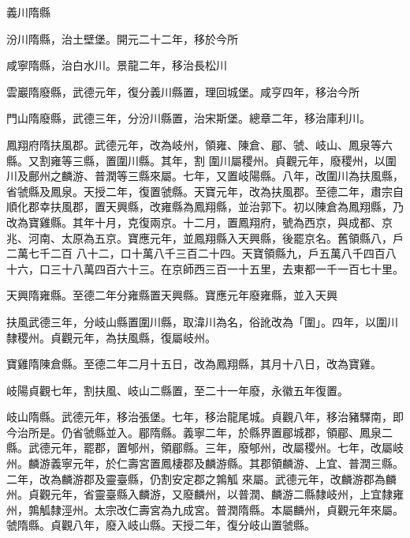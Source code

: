 \begin{pinyinscope}
 義川隋縣



 汾川隋縣，治土壁堡。開元二十二年，移於今所



 咸寧隋縣，治白水川。景龍二年，移治長松川



 雲巖隋廢縣，武德元年，復分義川縣置，理回城堡。咸亨四年，移治今所



 門山隋廢縣，武德三年，分汾川縣置，治宋斯堡。總章二年，移治庫利川。



 鳳翔府隋扶風郡。武德元年，改為岐州，領雍、陳倉、郿、虢、岐山、鳳泉等六縣。又割雍等三縣，置圍川縣。其年，割
 圍川屬稷州。貞觀元年，廢稷州，以圍川及鄜州之麟游、普潤等三縣來屬。七年，又置岐陽縣。八年，改圍川為扶風縣，省虢縣及鳳泉。天授二年，復置虢縣。天寶元年，改為扶風郡。至德二年，肅宗自順化郡幸扶風郡，置天興縣，改雍縣為鳳翔縣，並治郭下。初以陳倉為鳳翔縣，乃改為寶雞縣。其年十月，克復兩京。十二月，置鳳翔府，號為西京，與成都、京兆、河南、太原為五京。寶應元年，並鳳翔縣入天興縣，後罷京名。舊領縣八，戶二萬七千二百
 八十二，口十萬八千三百二十四。天寶領縣九，戶五萬八千四百八十六，口三十八萬四百六十三。在京師西三百一十五里，去東都一千一百七十里。



 天興隋雍縣。至德二年分雍縣置天興縣。寶應元年廢雍縣，並入天興



 扶風武德三年，分岐山縣置圍川縣，取湋川為名，俗訛改為「圍」。四年，以圍川隸稷州。貞觀元年，為扶風縣，復屬岐州。



 寶雞隋陳倉縣。至德二年二月十五日，改為鳳翔縣，其月十八日，改為寶雞。



 岐陽貞觀七年，割扶風、岐山二縣置，至二十一年廢，永徽五年復置。



 岐山隋縣。武德元年，移治張堡。七年，移治龍尾城。貞觀八年，移治豬驛南，即今治所是。仍省虢縣並入。郿隋縣。義寧二年，於縣界置郿城郡，領郿、鳳泉二縣。武德元年，罷郡，置郇州，領郿縣。三年，廢郇州，改屬稷州。七年，改屬岐州。麟游義寧元年，於仁壽宮置鳳棲郡及麟游縣。其郡領麟游、上宜、普潤三縣。二年，改為麟游郡及靈臺縣，仍割安定郡之鶉觚
 來屬。武德元年，改麟游郡為麟州。貞觀元年，省靈臺縣入麟游，又廢麟州，以普潤、麟游二縣隸岐州，上宜隸雍州，鶉觚隸涇州。太宗改仁壽宮為九成宮。普潤隋縣。本屬麟州，貞觀元年來屬。虢隋縣。貞觀八年，廢入岐山縣。天授二年，復分岐山置虢縣。




\end{pinyinscope}
